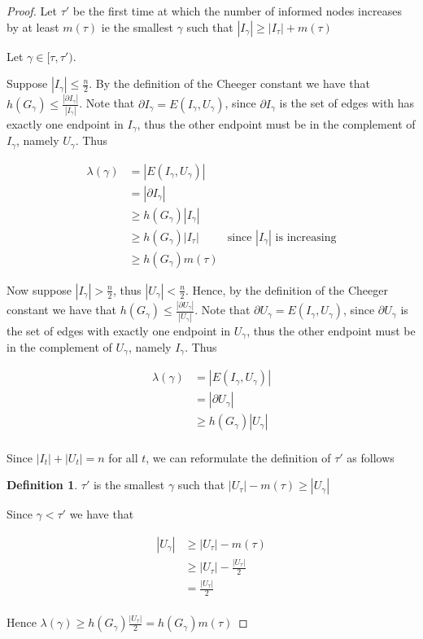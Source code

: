 \documentclass[a4paper,11pt]{article}
\theoremstyle{definition}
\newtheorem{definition}[theorem]{Definition}
\begin{document}
\begin{proof}

	Let $\tau'$ be the first time at which the number of informed nodes increases by at least $m(\tau)$ ie the smallest $\gamma$ such that $|I_{\gamma}| \geq |I_\tau| + m(\tau)$
	
	Let $ \gamma \in [\tau, \tau')$.

	Suppose  $|I_\gamma| \leq \frac{n}{2}$. By the definition of the Cheeger constant we have that $h(G_\gamma) \leq \frac{|\partial I_\gamma|}{|I_\gamma|}$. Note that $ \partial I_\gamma = E(I_\gamma, U_\gamma)$, since $\partial I_\gamma$ is the set of edges with has exactly one endpoint in $I_\gamma$, thus the other endpoint must be in the complement of $I_\gamma$, namely $U_\gamma$. Thus

	\begin{align*}
		\lambda(\gamma) &= |E(I_\gamma, U_\gamma)| \\
		& = |\partial I_\gamma| \\
		& \geq h(G_\gamma) |I_\gamma| \\
		& \geq h(G_\gamma) |I_\tau| & \text{since } |I_\gamma| \text{ is increasing} \\
		& \geq h(G_\gamma) m(\tau)
	\end{align*}
		
	Now suppose $|I_\gamma| > \frac{n}{2}$, thus $|U_\gamma| < \frac{n}{2}$. Hence, by the definition of the Cheeger constant we have that $h(G_\gamma) \leq \frac{|\partial U_\gamma|}{|U_\gamma|}$. Note that $ \partial U_\gamma = E(I_\gamma, U_\gamma)$, since $\partial U_\gamma$ is the set of edges with exactly one endpoint in $U_\gamma$,  thus the other endpoint must be in the complement of $U_\gamma$, namely $I_\gamma$. Thus 

	\begin{align*}
		\lambda(\gamma) &= |E(I_\gamma, U_\gamma)| \\
		& = |\partial U_\gamma| \\
		& \geq h(G_\gamma) |U_\gamma| \\
	\end{align*} 

	Since $|I_t| + |U_t| = n$ for all $t$, we can reformulate the definition of $\tau'$ as follows

	\begin{definition}
		$\tau'$ is the smallest $\gamma$ such that $|U_\tau| - m(\tau) \geq |U_\gamma|$
	\end{definition}
	
	Since $\gamma < \tau'$ we have that

	\begin{align*}
		|U_\gamma| & \geq |U_\tau| - m(\tau) \\
		& \geq |U_\tau| - \frac{|U_\tau|}{2} \\
		& = \frac{|U_\tau|}{2} \\
	\end{align*}
	
	Hence $\lambda(\gamma) \geq h(G_\gamma)\frac{|U_\tau|}{2} = h(G_\gamma)m(\tau)$

\end{proof}
\end{document}
